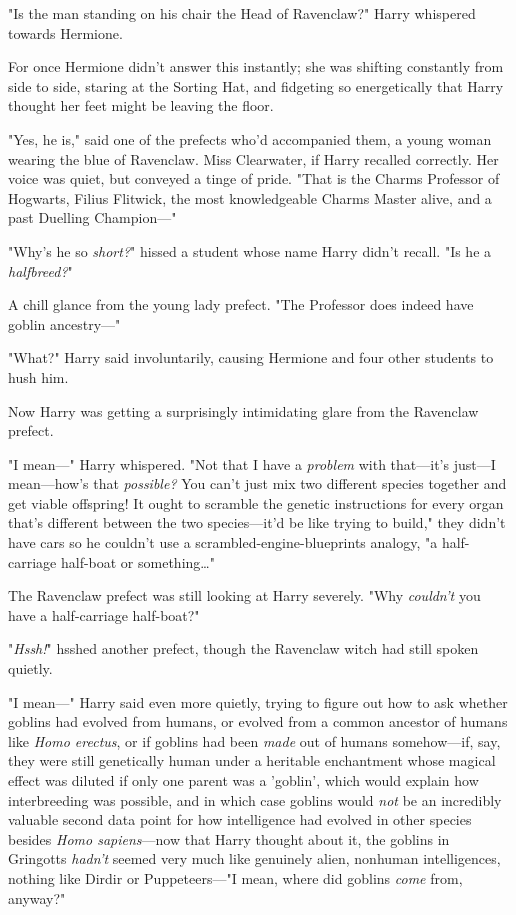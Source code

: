 "Is the man standing on his chair the Head of Ravenclaw?" Harry whispered 
towards Hermione.

For once Hermione didn't answer this instantly; she was shifting constantly 
from side to side, staring at the Sorting Hat, and fidgeting so energetically 
that Harry thought her feet might be leaving the floor.

"Yes, he is," said one of the prefects who'd accompanied them, a young woman 
wearing the blue of Ravenclaw. Miss Clearwater, if Harry recalled correctly. 
Her voice was quiet, but conveyed a tinge of pride. "That is the Charms 
Professor of Hogwarts, Filius Flitwick, the most knowledgeable Charms Master 
alive, and a past Duelling Champion---"

"Why's he so \emph{short?}" hissed a student whose name Harry didn't recall. 
"Is he a \emph{halfbreed?}"

A chill glance from the young lady prefect. "The Professor does indeed have 
goblin ancestry---"

"What?" Harry said involuntarily, causing Hermione and four other students to 
hush him.

Now Harry was getting a surprisingly intimidating glare from the Ravenclaw 
prefect.

"I mean---" Harry whispered. "Not that I have a \emph{problem} with that---it's 
just---I mean---how's that \emph{possible?} You can't just mix two different 
species together and get viable offspring! It ought to scramble the genetic 
instructions for every organ that's different between the two species---it'd be 
like trying to build," they didn't have cars so he couldn't use a 
scrambled-engine-blueprints analogy, "a half-carriage half-boat or 
something{\ldots}"

The Ravenclaw prefect was still looking at Harry severely. "Why \emph{couldn't} 
you have a half-carriage half-boat?"

"\emph{Hssh!}" hsshed another prefect, though the Ravenclaw witch had still 
spoken quietly.

"I mean---" Harry said even more quietly, trying to figure out how to ask 
whether goblins had evolved from humans, or evolved from a common ancestor of 
humans like \emph{Homo erectus}, or if goblins had been \emph{made} out of 
humans somehow---if, say, they were still genetically human under a heritable 
enchantment whose magical effect was diluted if only one parent was a 'goblin', 
which would explain how interbreeding was possible, and in which case goblins 
would \emph{not} be an incredibly valuable second data point for how 
intelligence had evolved in other species besides \emph{Homo sapiens}---now 
that Harry thought about it, the goblins in Gringotts \emph{hadn't} seemed very 
much like genuinely alien, nonhuman intelligences, nothing like Dirdir or 
Puppeteers---"I mean, where did goblins \emph{come} from, anyway?"

